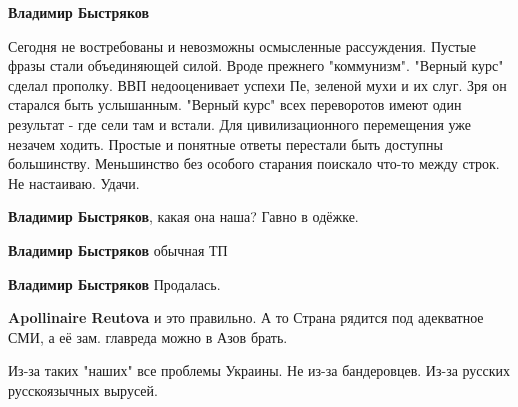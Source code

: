 \begin{itemize}
\begin{itemize}
\textbf{Владимир Быстряков} 

Сегодня не востребованы и невозможны осмысленные рассуждения. Пустые фразы
стали объединяющей силой. Вроде прежнего "коммунизм". "Верный курс" сделал
прополку. ВВП недооценивает успехи Пе, зеленой мухи и их слуг. Зря он старался
быть услышанным. "Верный курс" всех переворотов имеют один результат - где сели
там и встали. Для цивилизационного перемещения уже незачем ходить. Простые и
понятные ответы перестали быть доступны большинству. Меньшинство без особого
старания поискало что-то между строк. Не настаиваю. Удачи.


 
\textbf{Владимир Быстряков}, какая она наша?
Гавно в одёжке.

 
\textbf{Владимир Быстряков} обычная ТП

 
\textbf{Владимир Быстряков} Продалась.

 
\textbf{Apollinaire Reutova} и это правильно. А то Страна рядится под адекватное СМИ, а её зам. главреда можно в Азов брать.

 
Из-за таких "наших" все проблемы Украины. Не из-за бандеровцев. Из-за русских русскоязычных вырусей.

 

\end{itemize}
\end{itemize}
